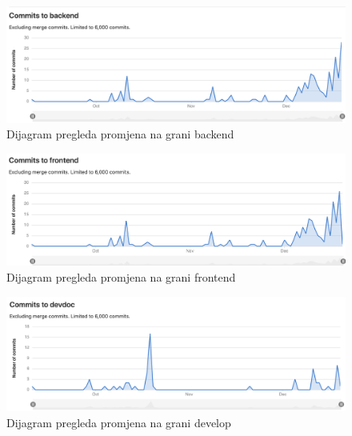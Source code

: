 		
		\begin{figure}[H]
			\includegraphics[width=\linewidth]{dijagrami/a.png}
			\centering
			\caption{Dijagram pregleda promjena na grani backend}
			\label{fig:ClassDiagram1}
		\end{figure}
	\begin{figure}[H]
		\includegraphics[width=\linewidth]{dijagrami/b.png}
		\centering
		\caption{Dijagram pregleda promjena na grani frontend}
		\label{fig:ClassDiagram1}
	\end{figure}
\begin{figure}[H]
	\includegraphics[width=\linewidth]{dijagrami/c.png}
	\centering
	\caption{Dijagram pregleda promjena na grani develop}
	\label{fig:ClassDiagram1}
\end{figure}
		
	